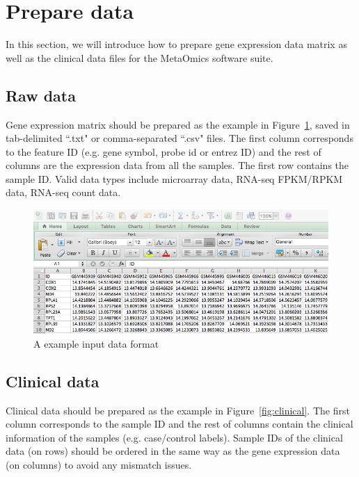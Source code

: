 
\section{Prepare data}
\label{sec:dataPrepare}
In this section, we will introduce how to prepare gene expression data matrix as well as the clinical data files for the MetaOmics software suite.

\subsection{Raw data}

Gene expression matrix should be prepared as the example in Figure~\ref{fig:dataMicroarray}, saved in tab-delimited ``.txt" or comma-separated ``.csv" files.
The first column corresponds to the feature ID (e.g. gene symbol, probe id or entrez ID) and the rest of columns are the expression data from all the samples.
The first row contains the sample ID.
Valid data types include microarray data, RNA-seq FPKM/RPKM data, RNA-seq count data.

\begin{figure}[H]
\begin{center}
\includegraphics[scale=0.5]{./figure/dataPreparation/dataMicroarray}
\caption{A example input data format}
\label{fig:dataMicroarray}
\end{center}
\end{figure}

\subsection{Clinical data}

Clinical data should be prepared as the example in Figure~\ref{fig:clinical}.
The first column corresponds to the sample ID and the rest of columns contain the clinical information of the samples (e.g. case/control labels). Sample IDs of the clinical data (on rows) should be ordered in the same way as the gene expression data (on columns) to avoid any mismatch issues.  

